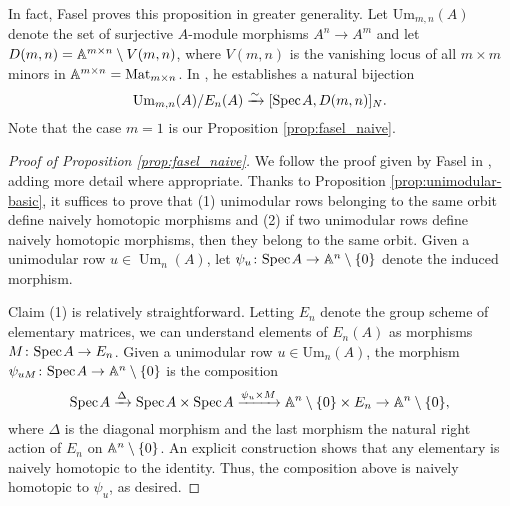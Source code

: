 \begin{remark}
    In fact, Fasel proves this proposition in greater generality. Let $\mathrm{Um}_{m,n}(A)$ denote the set of surjective $A$-module morphisms $A^n \to A^m$ and let $D(m,n) = \mathbb{A}^{m \times n}\setminus V(m,n)$, where $V(m,n)$ is the vanishing locus of all $m \times m$ minors in $\mathbb{A}^{m \times n} = \operatorname{Mat}_{m \times n}$. In \cite[Theorem 2.1]{Fasel-unim}, he establishes a natural bijection
    \[
    \operatorname{Um}_{m,n}(A)/E_n(A) \xrightarrow{\sim} [\text{Spec}\hspace{0.1em} A, D(m,n)]_{N}.
    \]
    Note that the case $m = 1$ is our Proposition \ref{prop:fasel_naive}. 
\end{remark}

\begin{proof}[Proof of Proposition \ref{prop:fasel_naive}]
    We follow the proof given by Fasel in \cite[Theorem 2.1]{Fasel-unim}, adding more detail where appropriate. Thanks to Proposition \ref{prop:unimodular-basic}, it suffices to prove that (1) unimodular rows belonging to the same orbit define naively homotopic morphisms and (2) if two unimodular rows define naively homotopic morphisms, then they belong to the same orbit. Given a unimodular row $u \in \operatorname{Um}_n(A)$, let $\psi_u\colon \text{Spec}\hspace{0.1em} A \to \mathbb{A}^n\setminus\{0\}$ denote the induced morphism. 

    Claim (1) is relatively straightforward. Letting $E_n$ denote the group scheme of elementary matrices, we can understand elements of $E_n(A)$ as morphisms $M\colon \text{Spec}\hspace{0.1em} A \to E_n$. Given a unimodular row $u \in \mathrm{Um}_n(A)$, the morphism $\psi_{uM}\colon \text{Spec}\hspace{0.1em} A \to \mathbb{A}^n\setminus\{0\}$ is the composition
    \[
    \text{Spec}\hspace{0.1em} A \xrightarrow{\Delta} \text{Spec}\hspace{0.1em} A \times \text{Spec}\hspace{0.1em} A \xrightarrow{\psi_u \times M} \mathbb{A}^n\setminus\{0\} \times E_n \to \mathbb{A}^n \setminus \{0\}, 
    \]
    where $\Delta$ is the diagonal morphism and the last morphism the natural right action of $E_n$ on $\mathbb{A}^n \setminus\{0\}$. An explicit construction shows that any elementary is naively homotopic to the identity. Thus, the composition above is naively homotopic to $\psi_u$, as desired.
    

\end{proof}
